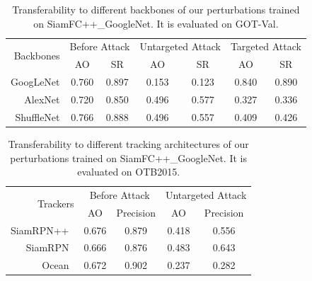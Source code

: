 \documentclass[journal]{IEEEtran}
\begin{document}
\begin{table}[t]
  \centering
  \caption{Transferability to different backbones of our perturbations trained on SiamFC++\_GoogleNet. It is evaluated on GOT-Val.}
  \begin{tabular}{rcccccc} 
  \toprule
  \multirow{2}{*}[-2pt]{Backbones} & \multicolumn{2}{c}{Before Attack} & \multicolumn{2}{c}{Untargeted Attack} & \multicolumn{2}{c}{Targeted Attack}  \\ 
  \cmidrule{2-7}
                            & AO    & SR                           & AO    & SR                           & AO    & SR                           \\ 
  \midrule
  GoogLeNet                 & 0.760 & 0.897                        & 0.153 & 0.123                        & 0.840 & 0.890                        \\
  AlexNet                   & 0.720 & 0.850                        & 0.496 & 0.577                        & 0.327 & 0.336                        \\
  ShuffleNet                & 0.766 & 0.888                        & 0.496 & 0.557                        & 0.409 & 0.426                       \\
  \bottomrule
  \end{tabular}
  \label{tab:backbone}
\end{table}
\begin{table}[t]
  \centering
  \caption{Transferability to different tracking architectures of our perturbations trained on SiamFC++\_GoogleNet. It is evaluated on OTB2015.}
  \begin{tabular}{rcccc} 
  \toprule
  \multirow{2}{*}[-2pt]{Trackers} & \multicolumn{2}{c}{Before Attack} & \multicolumn{2}{c}{Untargeted Attack}  \\
  \cmidrule{2-5}
                            & AO & Precision              & AO & Precision                   \\
  \midrule
  SiamRPN++~\cite{SiamRPN++}               & 0.676   & 0.879                  & 0.418   & 0.556                       \\
  SiamRPN~\cite{SiamRPN}                  & 0.666   & 0.876                  & 0.483   & 0.643                       \\
  Ocean~\cite{zhang2020ocean}                 & 0.672   & 0.902             & 0.237 & 0.282     \\ \bottomrule
  \end{tabular}
  \vspace{-3mm}
  \label{tab:arch}
\end{table}
\end{document}
